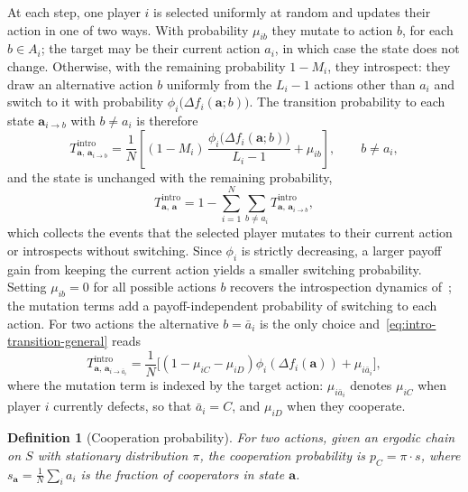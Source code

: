 \documentclass[11pt]{article}
\newtheorem{definition}{Definition}
\newcommand{\bfa}{\mathbf{a}}
\newcommand{\intro}{\mathrm{intro}}
\begin{document}
At each step, one player \(i\) is selected uniformly at random and updates
their action in one of two ways. With probability \(\mu_{ib}\) they mutate
to action \(b\), for each \(b\in A_i\); the target may be their current
action \(a_i\), in which case the state does not change. Otherwise, with
the remaining probability \(1-M_i\), they introspect: they draw an
alternative action \(b\) uniformly from the \(L_i-1\) actions other than
\(a_i\) and switch to it with probability
\(\phi_i\bigl(\Delta f_i(\bfa;b)\bigr)\). The transition probability to
each state \(\bfa_{i\to b}\) with \(b\neq a_i\) is therefore
\begin{equation}\label{eq:intro-transition-general}
  T^{\intro}_{\bfa,\,\bfa_{i\to b}}
  = \frac{1}{N}\left[(1-M_i)\,
    \frac{\phi_i\bigl(\Delta f_i(\bfa;b)\bigr)}{L_i-1}+\mu_{ib}\right],
  \qquad b\neq a_i,
\end{equation}
and the state is unchanged with the remaining probability,
\begin{equation}\label{eq:holding}
  T^{\intro}_{\bfa,\,\bfa}
  = 1-\sum_{i=1}^{N}\sum_{b\neq a_i} T^{\intro}_{\bfa,\,\bfa_{i\to b}},
\end{equation}
which collects the events that the selected player mutates to their
current action or introspects without switching.
Since \(\phi_i\) is strictly decreasing, a larger payoff gain from keeping
the current action yields a smaller switching probability. Setting
\(\mu_{ib}=0\) for all possible actions $b$ recovers the introspection dynamics
of~\cite{couto2022introspection,couto2023multiplayer}; the mutation terms add
a payoff-independent probability of switching to each action. For two
actions the alternative \(b=\bar{a}_i\) is the only
choice and~\eqref{eq:intro-transition-general} reads
\begin{equation}\label{eq:intro-transition}
  T^{\intro}_{\bfa,\,\bfa_{i\to\bar{a}_i}}
  = \frac{1}{N}\bigl[(1-\mu_{iC}-\mu_{iD})\phi_i(\Delta f_i(\bfa))
    +\mu_{i\bar{a}_i}\bigr],
\end{equation}
where the mutation term is indexed by the target action: \(\mu_{i\bar{a}_i}\)
denotes \(\mu_{iC}\) when player \(i\) currently defects, so that
\(\bar{a}_i=C\), and \(\mu_{iD}\) when they cooperate.

\begin{definition}[Cooperation probability]
For two actions, given an ergodic chain on \(S\) with stationary distribution
\(\pi\), the \emph{cooperation probability} is \(p_C=\pi\cdot s\), where
\(s_\bfa=\frac{1}{N}\sum_i a_i\) is the fraction of cooperators in state \(\bfa\).
\end{definition}
\end{document}
